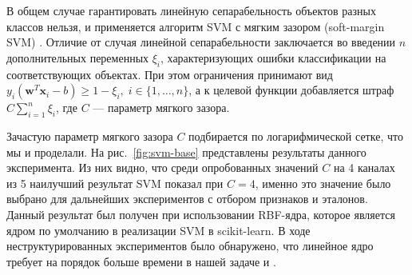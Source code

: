 В общем случае гарантировать линейную сепарабельность объектов разных классов нельзя, и применяется алгоритм SVM с мягким зазором (soft-margin SVM) \cite{cortes-vapnik}. Отличие от случая линейной сепарабельности заключается во введении \(n\) дополнительных переменных \(\xi_i\), характеризующих ошибки классификации на соответствующих объектах. При этом ограничения принимают вид \(y_i\left(\mathbf{w}^T\mathbf{x}_i - b\right)\geqslant 1-\xi_i,\;i\in\{1,\dotsc,n\}\), а к целевой функции добавляется штраф \(C\sum_{i=1}^n\xi_i\), где \(C\) --- параметр мягкого зазора.

Зачастую параметр мягкого зазора \(C\) подбирается по логарифмической сетке, что мы и проделали. На рис.~\ref{fig:svm-base} представлены результаты данного эксперимента. Из них видно, что среди опробованных значений \(C\) на 4 каналах из 5 наилучший результат SVM показал при \(C=4\), именно это значение было выбрано для дальнейших экспериментов с отбором признаков и эталонов. Данный результат был получен при использовании RBF-ядра, которое является ядром по умолчанию в реализации SVM в scikit-learn. В ходе неструктурированных экспериментов было обнаружено, что линейное ядро требует на порядок больше времени в нашей задаче и .

